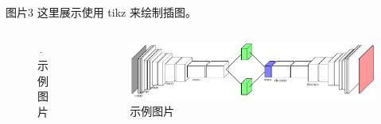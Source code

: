 \documentclass[aspectratio=169]{beamer}
\begin{document}
\begin{frame}{图片3}
    这里展示使用 tikz 来绘制插图。\\
    \begin{columns}[t]  %
        \begin{column}{0.3\textwidth}
            \begin{figure}[!ht]
                \centering
                \includegraphics[width=0.4\textwidth]{tikz/pic1/pic.pdf}
                \caption{示例图片}
                \label{fig:pic1}
            \end{figure}
        \end{column}
        \begin{column}{0.7\textwidth}
            \begin{figure}[!ht]
                \centering
                \includegraphics[width=\textwidth]{tikz/net/pic.pdf}
                \caption{示例图片}
                \label{fig:net}
            \end{figure}
        \end{column}
    \end{columns}
\end{frame}
\end{document}
